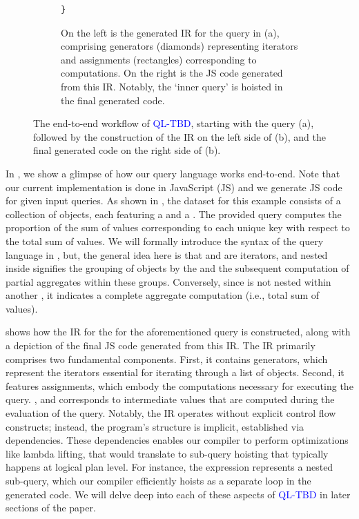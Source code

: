 \documentclass[runningheads]{llncs}
\newcommand{\lang}{\textcolor{blue}{QL-TBD}}
\begin{document}
\begin{figure}
\begin{subfigure}{\textwidth}
\begin{minipage}{0.62\textwidth}
\begin{lstlisting}[style=JavaScript,columns=flexible]
}
\end{lstlisting}
\end{minipage}
\caption{
On the left is the generated IR for the query in (a), comprising generators
(diamonds) representing iterators and assignments (rectangles) corresponding
to computations.
On the right is the JS code generated from this IR.
Notably, the `inner query' is hoisted in the final
generated code.
}\label{fig:ir_code}
\end{subfigure}

\caption{
The end-to-end workflow of \lang{}, starting with the query (a),
followed by the construction of the IR on the left side of (b), and the
final generated code on the right side of (b).
}\label{fig:intro}
\vspace{-5mm}
\end{figure}


In , we show a glimpse of how our query language works end-to-end.
Note that our current implementation is done in JavaScript (JS) and we generate JS code for given input queries.
As shown in , the dataset for this example consists of a collection
of objects, each featuring a  and a .
The provided query computes the proportion of the sum of values corresponding to
each unique key with respect to the total sum of values.
We will formally introduce the syntax of the query language in ,
but, the general idea here is that  and  are iterators, and 
 nested inside  signifies the grouping of objects by the
 and the subsequent computation of partial aggregates within these groups.
Conversely, since  is not nested within another , it indicates
a complete aggregate computation (i.e., total sum of values).

 shows how the IR for the  for the aforementioned query is
constructed, along with a depiction of the final JS code generated from this IR.
The IR primarily comprises two fundamental components.
First, it contains generators, which represent the iterators essential for iterating
through a list of objects.
Second, it features assignments, which embody the computations necessary for executing
the query.
,  and  corresponds to intermediate values
that are computed during the evaluation of the query.
Notably, the IR operates without explicit control flow constructs; instead, the
program's structure is implicit, established via dependencies.
These dependencies enables our compiler to perform optimizations like lambda lifting,
that would translate to sub-query hoisting that typically happens at logical plan level.
For instance, the expression  represents a nested sub-query,
which our compiler efficiently hoists as a separate loop in the generated code.
We will delve deep into each of these aspects of \lang{} in later sections of the paper.
\end{document}
